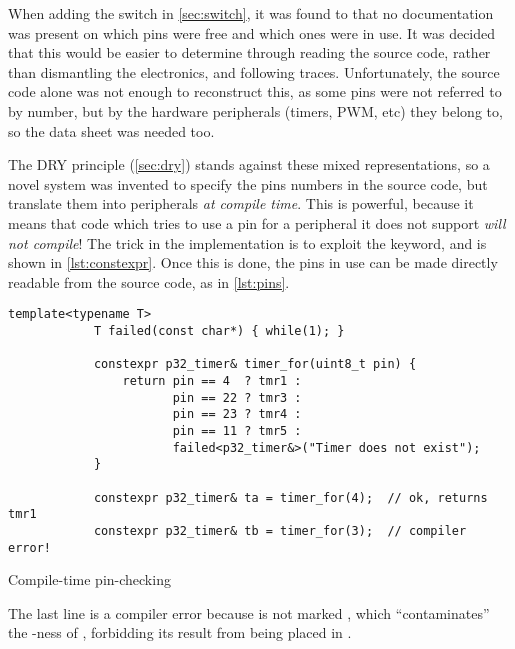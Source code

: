 \documentclass[main.tex]{subfiles}
\begin{document}
	When adding the switch in \cref{sec:switch}, it was found to that no documentation was present on which pins were free and which ones were in use. It was decided that this would be easier to determine through reading the source code, rather than dismantling the electronics, and following traces.
	Unfortunately, the source code alone was not enough to reconstruct this, as some pins were not referred to by number, but by the hardware peripherals (timers, PWM, etc) they belong to, so the data sheet was needed too.

	The DRY principle (\cref{sec:dry}) stands against these mixed representations, so a novel system was invented to specify the pins numbers in the source code, but translate them into peripherals \emph{at compile time}.
	This is powerful, because it means that code which tries to use a pin for a peripheral it does not support \emph{will not compile}! The trick in the implementation is to exploit the  keyword, and is shown in \cref{lst:constexpr}.
	Once this is done, the pins in use can be made directly readable from the source code, as in \cref{lst:pins}.

	\begin{listingfloat}
		\centering
		\begin{lstlisting}[language={[11]c++},gobble=6,frame=single]
			template<typename T>
			T failed(const char*) { while(1); }

			constexpr p32_timer& timer_for(uint8_t pin) {
				return pin == 4  ? tmr1 :
				       pin == 22 ? tmr3 :
				       pin == 23 ? tmr4 :
				       pin == 11 ? tmr5 :
				       failed<p32_timer&>("Timer does not exist");
			}

			constexpr p32_timer& ta = timer_for(4);  // ok, returns tmr1
			constexpr p32_timer& tb = timer_for(3);  // compiler error!
		\end{lstlisting}
		\caption{Compile-time pin-checking}
		\label{lst:constexpr}
		\medskip
		\small
		The last line is a compiler error because  is not marked , which \enquote{contaminates} the -ness of , forbidding its result from being placed in .
	\end{listingfloat}
\end{document}
